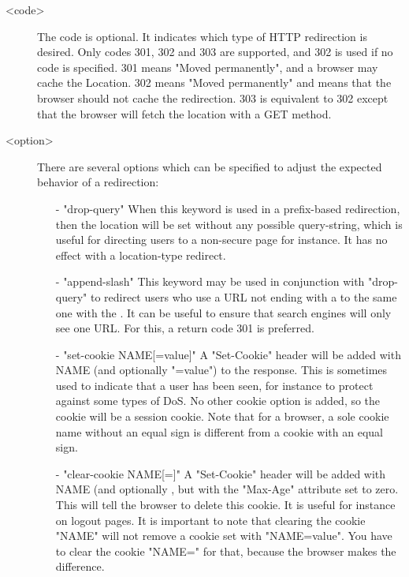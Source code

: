 {\begin{description}
  \item[<code>]
              The code is optional. It indicates which type of HTTP redirection
              is desired. Only codes 301, 302 and 303 are supported, and 302 is
              used if no code is specified. 301 means "Moved permanently", and
              a browser may cache the Location. 302 means "Moved permanently"
              and means that the browser should not cache the redirection. 303
              is equivalent to 302 except that the browser will fetch the
              location with a GET method.

  \item[<option>]
              There are several options which can be specified to adjust the
              expected behavior of a redirection:
      \begin{itemize}
      \item[-] "drop-query"
        When this keyword is used in a prefix-based redirection, then the
        location will be set without any possible query-string, which is useful
        for directing users to a non-secure page for instance. It has no effect
        with a location-type redirect.

      \item[-] "append-slash"
        This keyword may be used in conjunction with "drop-query" to redirect
        users who use a URL not ending with a \chr{/} to the same one with the \chr{/}.
        It can be useful to ensure that search engines will only see one URL.
        For this, a return code 301 is preferred.

      \item[-] "set-cookie NAME[=value]"
        A "Set-Cookie" header will be added with NAME (and optionally "=value")
        to the response. This is sometimes used to indicate that a user has
        been seen, for instance to protect against some types of DoS. No other
        cookie option is added, so the cookie will be a session cookie. Note
        that for a browser, a sole cookie name without an equal sign is
        different from a cookie with an equal sign.

      \item[-] "clear-cookie NAME[=]"
        A "Set-Cookie" header will be added with NAME (and optionally \chr{=}, but
        with the "Max-Age" attribute set to zero. This will tell the browser to
        delete this cookie. It is useful for instance on logout pages. It is
        important to note that clearing the cookie "NAME" will not remove a
        cookie set with "NAME=value". You have to clear the cookie "NAME=" for
        that, because the browser makes the difference.
      \end{itemize}
  \end{description}

}
